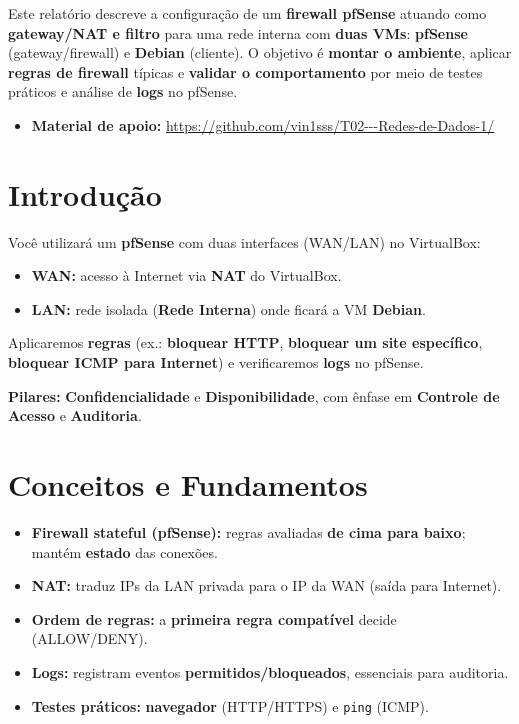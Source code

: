﻿




\tableofcontents
\newpage

\noindent
Este relatório descreve a configuração de um \textbf{firewall pfSense} atuando como \textbf{gateway/NAT e filtro} para uma rede interna com \textbf{duas VMs}: \textbf{pfSense} (gateway/firewall) e \textbf{Debian} (cliente). O objetivo é \textbf{montar o ambiente}, aplicar \textbf{regras de firewall} típicas e \textbf{validar o comportamento} por meio de testes práticos e análise de \textbf{logs} no pfSense.

\begin{itemize}
  \item \textbf{Material de apoio:} \url{https://github.com/vin1sss/T02---Redes-de-Dados-1/}
\end{itemize}

\section{Introdução}

Você utilizará um \textbf{pfSense} com duas interfaces (WAN/LAN) no VirtualBox:
\begin{itemize}
  \item \textbf{WAN:} acesso à Internet via \textbf{NAT} do VirtualBox.
  \item \textbf{LAN:} rede isolada (\textbf{Rede Interna}) onde ficará a VM \textbf{Debian}.
\end{itemize}

Aplicaremos \textbf{regras} (ex.: \textbf{bloquear HTTP}, \textbf{bloquear um site específico}, \textbf{bloquear ICMP para Internet}) e verificaremos \textbf{logs} no pfSense.

\textbf{Pilares:} \textbf{Confidencialidade} e \textbf{Disponibilidade}, com ênfase em \textbf{Controle de Acesso} e \textbf{Auditoria}.

\section{Conceitos e Fundamentos}

\begin{itemize}
  \item \textbf{Firewall stateful (pfSense):} regras avaliadas \textbf{de cima para baixo}; mantém \textbf{estado} das conexões.
  \item \textbf{NAT:} traduz IPs da LAN privada para o IP da WAN (saída para Internet).
  \item \textbf{Ordem de regras:} a \textbf{primeira regra compatível} decide (ALLOW/DENY).
  \item \textbf{Logs:} registram eventos \textbf{permitidos/bloqueados}, essenciais para auditoria.
  \item \textbf{Testes práticos:} \textbf{navegador} (HTTP/HTTPS) e \texttt{ping} (ICMP).
\end{itemize}

